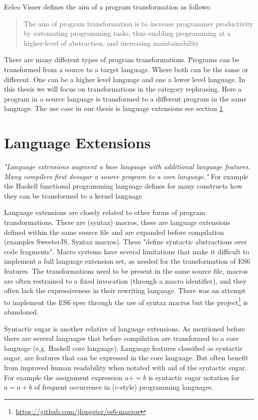 Eelco Visser defines the aim of a program transformation as follows:

\blockquote[\cite{Visser2001}]{The aim of program transformation is to increase programmer productivity by automating programming tasks, thus enabling programming at a higher-level of abstraction, and increasing maintainability}

There are many different types of program transformations. Programs can be transformed from a source to a target language. Where both can be the same or different. One can be a higher level language and one a lower level language. In this thesis we will focus on transformations in the category rephrasing\cite{Visser2001}. Here a program in a source language is transformed to a different program in the same language. The use case in our thesis is language extensions see section \ref{lang-ext}.

\section{Language Extensions} \label{lang-ext}
\textit{"Language extensions augment a base language with additional language features. Many compilers first desugar a source program to a core language."}\cite{Erdweg2014} For example the Haskell functional programming language defines for many constructs how they can be transformed to a kernel language\cite{PeytonJones}

Language extensions are closely related to other forms of program transformations. There are (syntax) macros\cite{Leavenworth1966}, these are language extensions defined within the same source file and are expanded before compilation (examples SweeterJS\cite{Disney2014}, Syntax macros\cite{Weise1993}). These "define syntactic abstractions over code fragments"\cite{Bravenboer2004}. Macro systems have several limitations that make it difficult to implement a full language extension set, as needed for the transformation of ES6 features. The transformations need to be present in the same source file, macros are often restrained to a fixed invocation (through a macro identifier), and they often lack the expressiveness in their rewriting language\cite{Bravenboer2004}. There was an attempt to implement the ES6 spec through the use of syntax macros but the project\footnote{\url{https://github.com/jlongster/es6-macros}} is abandoned.

Syntactic sugar is another relative of language extensions. As mentioned before there are several languages that before compilation are transformed to a core language (e.g. Haskell core language).  Language features classified as syntactic sugar, are features that can be expressed in the core language. But often benefit from improved human readability when notated with aid of the syntactic sugar. For example the assignment expression $a += b$ is syntactic sugar notation for $a = a + b$ of frequent occurrence in (c-style) programming languages.

